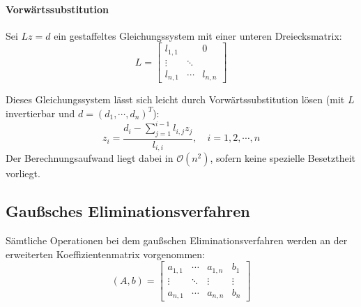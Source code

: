 			\paragraph{Vorwärtssubstitution}
				Sei \( Lz = d \) ein gestaffeltes Gleichungssystem mit einer unteren Dreiecksmatrix:
				\begin{equation*}
					L =
					\begin{bmatrix}
						l_{1,1} &        & 0       \\
						\vdots  & \ddots &         \\
						l_{n,1} & \cdots & l_{n,n}
					\end{bmatrix}
				\end{equation*}

				Dieses Gleichungssystem lässt sich leicht durch Vorwärtssubstitution lösen (mit \(L\) invertierbar und \( d = (d_1, \cdots, d_n)^T \)):
				\begin{equation*}
					z_i = \frac{d_i - \sum_{j=1}^{i-1} l_{i,j} z_j}{l_{i,i}}, \quad i = 1, 2, \cdots, n
				\end{equation*}
				Der Berechnungsaufwand liegt dabei in \( \mathcal{O}(n^2) \), sofern keine spezielle Besetztheit vorliegt.

		\subsection{Gaußsches Eliminationsverfahren}
			Sämtliche Operationen bei dem gaußschen Eliminationsverfahren werden an der erweiterten Koeffizientenmatrix vorgenommen:
			\begin{equation*}
				(A, b) =
				\left[
					\begin{array}{ccc|c}
						a_{1,1} & \cdots & a_{1,n} & b_1    \\
						\vdots  & \ddots & \vdots  & \vdots \\
						a_{n,1} & \cdots & a_{n,n} & b_n
					\end{array}
					\right]
			\end{equation*}

